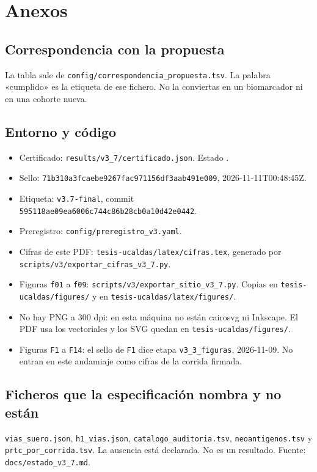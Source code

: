 \chapter{Anexos}

\section{Correspondencia con la propuesta}
La tabla sale de \texttt{config/correspondencia\_propuesta.tsv}. La palabra «cumplido» es la etiqueta de ese fichero. No la conviertas en un biomarcador ni en una cohorte nueva.

{\small

}

\section{Entorno y código}
\begin{itemize}
\item Certificado: \texttt{results/v3\_7/certificado.json}. Estado \CertificadoEstado.
\item Sello: \texttt{71b310a3fcaebe9267fac971156df3aab491e009}, 2026-11-11T00:48:45Z.
\item Etiqueta: \texttt{v3.7-final}, commit \texttt{595118ae09ea6006c744c86b28cb0a10d42e0442}.
\item Preregistro: \texttt{config/preregistro\_v3.yaml}.
\item Cifras de este PDF: \texttt{tesis-ucaldas/latex/cifras.tex}, generado por \texttt{scripts/v3/exportar\_cifras\_v3\_7.py}.
\item Figuras \texttt{f01} a \texttt{f09}: \texttt{scripts/v3/exportar\_sitio\_v3\_7.py}. Copias en \texttt{tesis-ucaldas/figures/} y en \texttt{tesis-ucaldas/latex/figures/}.
\item No hay PNG a 300 dpi: en esta máquina no están cairosvg ni Inkscape. El PDF usa los vectoriales y los SVG quedan en \texttt{tesis-ucaldas/figures/}.
\item Figuras \texttt{F1} a \texttt{F14}: el sello de \texttt{F1} dice etapa \texttt{v3\_3\_figuras}, 2026-11-09. No entran en este andamiaje como cifras de la corrida firmada.
\end{itemize}

\section{Ficheros que la especificación nombra y no están}
\texttt{vias\_suero.json}, \texttt{h1\_vias.json}, \texttt{catalogo\_auditoria.tsv}, \texttt{neoantigenos.tsv} y \texttt{prtc\_por\_corrida.tsv}. La ausencia está declarada. No es un resultado. Fuente: \texttt{docs/estado\_v3\_7.md}.
